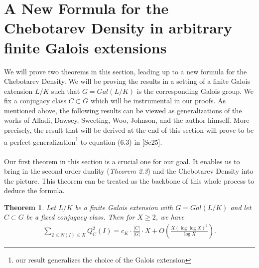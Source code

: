 \documentclass[12pt]{article}
\numberwithin{equation}{section}
\newtheorem{theorem}{Theorem}[section]
\numberwithin{equation}{section}
\begin{document}
\section{A New Formula for the Chebotarev Density in arbitrary finite Galois extensions}
We will prove two theorems in this section, leading up to a new formula for the Chebotarev Density. We will be proving the results in a setting of a finite Galois extension $L/K$ such that $G=Gal(L/K)$ is the corresponding Galois group. We fix a conjugacy class $C\subset G$ which will be instrumental in our proofs. As mentioned above, the following results can be viewed as generalizations of the works of Alladi, Dawsey, Sweeting, Woo, Johnson, and the author himself. More precisely, the result that will be derived at the end of this section will prove to be a perfect generalization\footnote[10]{our result generalizes the choice of the Galois extension} to equation (6.3) in [Se25]. \\ \\
Our first theorem in this section is a crucial one for our goal. It enables us to bring in the second order duality (\textit{Theorem 2.3}) and the Chebotarev Density into the picture. This theorem can be treated as the backbone of this whole process to deduce the formula. 
\begin{theorem}
    Let $L/K$ be a finite Galois extension with $G=Gal(L/K)$ and let $C \subset G$ be a fixed conjugacy class. Then for $X\geq 2$, we have
    \begin{align}
         \sum_{2 \leq N(I)\leq X} Q^2_C(I) = c_K\cdot \frac{|C|}{|G|}\cdot X + O\left(\frac{X(\log\log X)^2}{\log X}\right). \nonumber
    \end{align}
    \end{theorem}
\end{document}
